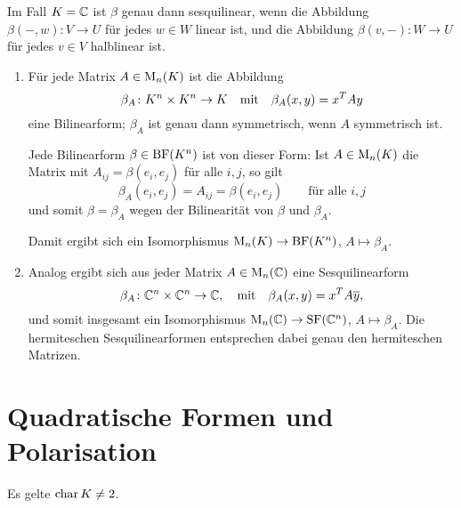 Im Fall $K = \mathbb{C}$ ist $\beta$ genau dann sesquilinear, wenn die Abbildung $\beta(-,w) \colon V \to U$ für jedes $w \in W$ linear ist, und die Abbildung $\beta(v,-) \colon W \to U$ für jedes $v \in V$ halblinear ist.

\begin{example}
  \leavevmode
  \begin{enumerate}
    \item
      Für jede Matrix $A \in \operatorname{M}_{n}(K)$ ist die Abbildung
      \[
                \beta_A
        \colon  K^n \times K^n
        \to     K
        \quad\text{mit}\quad
          \beta_A(x,y)
        = x^T A y
      \]
      eine Bilinearform;
      $\beta_A$ ist genau dann symmetrisch, wenn $A$ symmetrisch ist.
      
      Jede Bilinearform $\beta \in \operatorname{BF}(K^n)$ ist von dieser Form:
      Ist $A \in \operatorname{M}_{n}(K)$ die Matrix mit $A_{ij} = \beta(e_i, e_j)$ für alle $i, j$, so gilt
      \[
        \beta_A(e_i, e_j) = A_{ij} = \beta(e_i, e_j)
        \qquad
        \text{für alle $i, j$}
      \]
      und somit $\beta = \beta_A$ wegen der Bilinearität von $\beta$ und $\beta_A$.
      
      Damit ergibt sich ein Isomorphismus $\operatorname{M}_{n}(K) \to \operatorname{BF}(K^n)$, $A \mapsto \beta_A$.
      
    \item
      Analog ergibt sich aus jeder Matrix $A \in \operatorname{M}_{n}(\mathbb{C})$ eine Sesquilinearform
      \[
                \beta_A
        \colon  \mathbb{C}^n \times \mathbb{C}^n
        \to     \mathbb{C},
        \quad\text{mit}\quad
          \beta_A(x,y)
        = x^T A \overline{y},
      \]
      und somit insgesamt ein Isomorphismus $\operatorname{M}_{n}(\mathbb{C}) \to \operatorname{SF}(\mathbb{C}^n)$, $A \mapsto \beta_A$.
      Die hermiteschen Sesquilinearformen entsprechen dabei genau den hermiteschen Matrizen.
  \end{enumerate}
\end{example}





\section{Quadratische Formen und Polarisation}
\label{section: quadratic forms and polarisation}

Es gelte $\operatorname{char} K \neq 2$.

